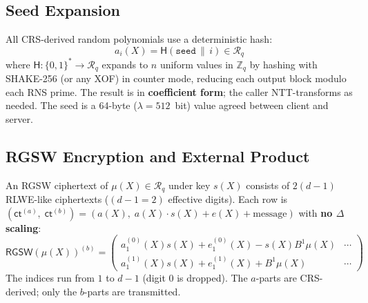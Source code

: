 \documentclass[11pt,a4paper]{article}
\newcommand{\Z}{\mathbb{Z}}
\newcommand{\R}{\mathcal{R}}
\newcommand{\Rq}{\R_{q}}
\begin{document}
\subsection{Seed Expansion}\label{sec:seed}

All CRS-derived random polynomials use a deterministic hash:
\begin{equation}
    a_i(X) = \mathsf{H}(\texttt{seed} \,\|\, i) \in \Rq
    \label{eq:seed-expand}
\end{equation}
where $\mathsf{H}: \{0,1\}^* \to \Rq$ expands to $n$ uniform values in $\Z_q$ by hashing with SHAKE-256 (or any XOF) in counter mode, reducing each output block modulo each RNS prime.
The result is in \textbf{coefficient form}; the caller NTT-transforms as needed.
The seed is a 64-byte ($\lambda = 512$~bit) value agreed between client and server.

\subsection{RGSW Encryption and External Product}\label{sec:rgsw}

An RGSW ciphertext of $\mu(X) \in \Rq$ under key $s(X)$ consists of $2(d\!-\!1)$ RLWE-like ciphertexts ($(d\!-\!1 = 2)$ effective digits).
Each row is $(\mathsf{ct}^{(a)},\; \mathsf{ct}^{(b)}) = (a(X),\; a(X) \cdot s(X) + e(X) + \text{message})$ with \textbf{no $\Delta$ scaling}:
\begin{equation}
    \mathsf{RGSW}(\mu(X))^{(b)} =
    \begin{pmatrix}
        a^{(0)}_1(X) s(X) + e^{(0)}_1(X) - s(X) B^1 \mu(X) & \cdots \\
        a^{(1)}_1(X) s(X) + e^{(1)}_1(X) + B^1 \mu(X) & \cdots
    \end{pmatrix}
    \label{eq:rgsw}
\end{equation}
The indices run from $1$ to $d-1$ (digit $0$ is dropped).
The $a$-parts are CRS-derived; only the $b$-parts are transmitted.
\end{document}

